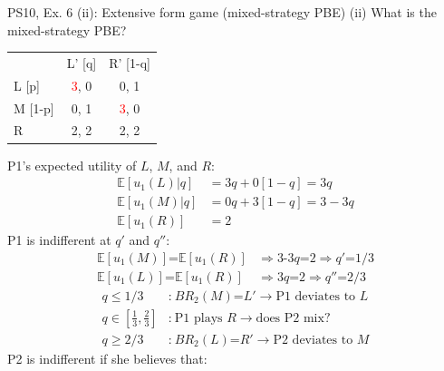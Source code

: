 \begin{frame}{PS10, Ex. 6 (ii): Extensive form game (mixed-strategy PBE)}
    (ii) What is the mixed-strategy PBE? \vspace{-10pt}
    \begin{multicols}{2}
      \begin{table}
        \begin{tabular}{l|c|c|}
          \multicolumn{1}{c}{} & \multicolumn{1}{c}{L' [q]} & \multicolumn{1}{c}{R' [1-q]} \\\cline{2-3}
          L [p]   & \textcolor{red}{3}, 0 & 0, \color{blue}1 \\\cline{2-3}
          M [1-p] & 0, \color{blue}1 & \textcolor{red}{3}, 0 \\\cline{2-3}
          R       & 2, \color{blue}2 & 2, \color{blue}2 \\\cline{2-3}
        \end{tabular}
      \end{table} \vspace{-6pt}
      P1's expected utility of $L$, $M$, and $R$: \vspace{-6pt}
      \begin{align*}
        \mathbb{E}[u_1(L)|q]&=3q+0[1-q]=3q\\
        \mathbb{E}[u_1(M)|q]&=0q+3[1-q]=3-3q\\
        \mathbb{E}[u_1(R)]&=2
      \end{align*}
      P1 is indifferent at $q'$ and $q''$: \vspace{-6pt}
      \begin{align*}
        \mathbb{E}[u_1(M)]\text{=}\mathbb{E}[u_1(R)]&\Rightarrow \text{3-3}q\text{=}2\Rightarrow q'\text{=}1/3\\
        \mathbb{E}[u_1(L)]\text{=}\mathbb{E}[u_1(R)]&\Rightarrow 3q\text{=}2\Rightarrow q''\text{=}2/3
      \end{align*} \vspace{-20pt}
      \begin{align*}
        q\leq1/3&\text{:}\ BR_2(M)\text{=}L'\rightarrow\text{P1 deviates to }L\\
        q\text{$\in$}{\textstyle\left[\frac{1}{3},\frac{2}{3}\right]}&\text{:}\ \text{P1 plays }R\rightarrow\text{does P2 mix?}\\
        q\geq2/3&\text{:}\ BR_2(L)\text{=}R'\rightarrow\text{P2 deviates to }M
      \end{align*}
      P2 is indifferent if she believes that: \vspace{-6pt}

\end{multicols}
\end{frame}
